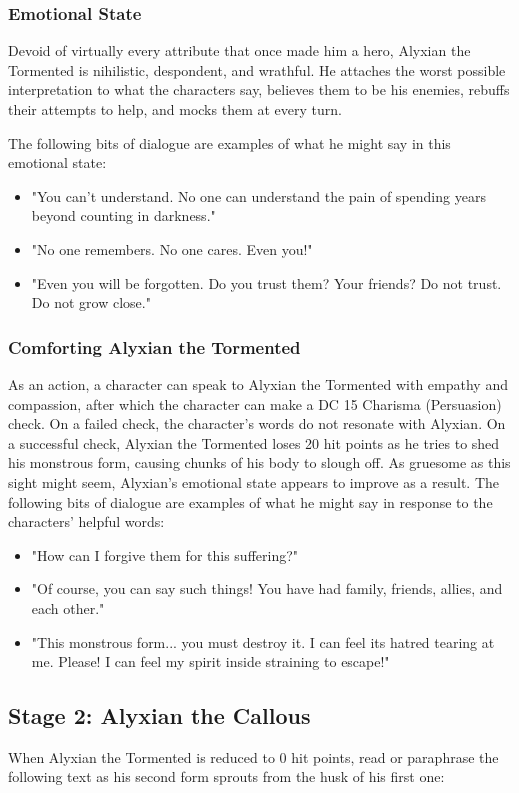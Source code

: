 \documentclass[10pt,a4paper,twoside,bg=print,twocolumn,openany,nodeprecatedcode]{dndbook}
\begin{document}
\subsubsection{Emotional State}
Devoid of virtually every attribute that once made him a hero, Alyxian the Tormented is nihilistic, despondent, and wrathful. He attaches the worst possible interpretation to what the characters say, believes them to be his enemies, rebuffs their attempts to help, and mocks them at every turn.

The following bits of dialogue are examples of what he might say in this emotional state:


\begin{itemize}
\item "You can't understand. No one can understand the pain of spending years beyond counting in darkness."
\item "No one remembers. No one cares. Even you!"
\item "Even you will be forgotten. Do you trust them? Your friends? Do not trust. Do not grow close."
\end{itemize}


\subsubsection{Comforting Alyxian the Tormented}
As an action, a character can speak to Alyxian the Tormented with empathy and compassion, after which the character can make a DC 15 Charisma (Persuasion) check. On a failed check, the character's words do not resonate with Alyxian. On a successful check, Alyxian the Tormented loses 20 hit points as he tries to shed his monstrous form, causing chunks of his body to slough off. As gruesome as this sight might seem, Alyxian's emotional state appears to improve as a result. The following bits of dialogue are examples of what he might say in response to the characters' helpful words:


\begin{itemize}
\item "How can I forgive them for this suffering?"
\item "Of course, you can say such things! You have had family, friends, allies, and each other."
\item "This monstrous form... you must destroy it. I can feel its hatred tearing at me. Please! I can feel my spirit inside straining to escape!"
\end{itemize}


\subsection{Stage 2: Alyxian the Callous}
When Alyxian the Tormented is reduced to 0 hit points, read or paraphrase the following text as his second form sprouts from the husk of his first one:
\end{document}
